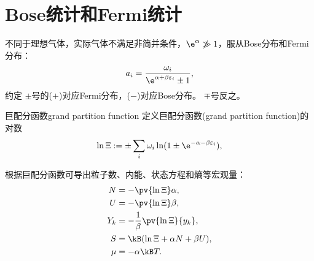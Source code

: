 \newcommand*{\tv}{\mathrm t}  %
\newcommand*{\lt}{\mathrm l}  %
\newcommand*{\Db}{\mathrm D}
\newcommand*{\Fm}{\mathrm F}

\chapter{Bose统计和Fermi统计}

不同于理想气体，实际气体不满足非简并条件，$\e^\alpha\not\gg 1$，服从Bose分布和Fermi分布：
\begin{equation}
	a_i=\frac{\omega_i}{\e^{\alpha+\beta\varepsilon_i}\pm 1},
\end{equation}
约定
$\pm$号的($+$)对应Fermi分布，($-$)对应Bose分布。
$\mp$号反之。

\begin{definition}{巨配分函数}{grand partition function}
	定义巨配分函数(grand partition function)的对数
	\begin{equation}
		\ln\Xi:=\pm\sum_i\omega_i\ln(1\pm\e^{-\alpha-\beta\varepsilon_i}),
	\end{equation}
\end{definition}

\begin{corollary}
	根据巨配分函数可导出粒子数、内能、状态方程和熵等宏观量：
	\begin{subequations}
		\begin{align}
			N&=-\pv{\ln\Xi}\alpha,\\
			U&=-\pv{\ln\Xi}\beta,\\
			Y_k&=-\frac1\beta\pv{\ln\Xi}{y_k},\\
			S&=\kB(\ln\Xi+\alpha N+\beta U),\\
			\mu&=-\alpha\kB T.
		\end{align}
	\end{subequations}
\end{corollary}

